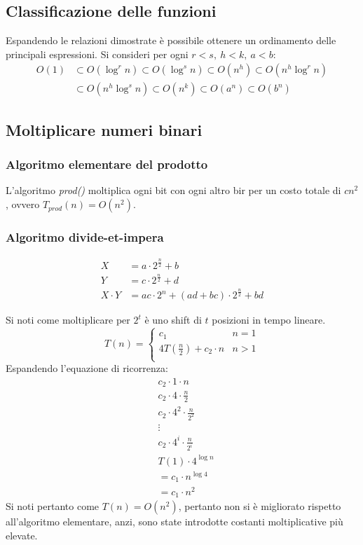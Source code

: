 \subsection{Classificazione delle funzioni}
Espandendo le relazioni dimostrate \`e possibile ottenere un ordinamento delle principali espressioni. Si consideri per ogni $r<s,\ h<k,\ a<b$:
\begin{align*}
O(1)&\subset O(\log^r n)\subset O(\log^s n)\subset O(n^h)\subset O(n^h\log^r n)\\
&\subset O(n^h\log^s n)\subset O(n^k)\subset O(a^n)\subset O(b^n)
\end{align*}
\subsection{Moltiplicare numeri binari}
\subsubsection{Algoritmo elementare del prodotto}
L'algoritmo \emph{prod()} moltiplica ogni bit con ogni altro bir per un costo totale di $cn^2$, ovvero $T_{prod}(n)=O(n^2)$.
\subsubsection{Algoritmo divide-et-impera}
\begin{align*}
	X &= a\cdot 2^{\frac{n}{2}}+ b\\
	Y &= c\cdot 2^{\frac{n}{2}}+ d\\
 X\cdot Y &= ac\cdot 2^n + (ad+bc)\cdot 2^{\frac{n}{2}} +bd
\end{align*}

Si noti come moltiplicare per $2^t$ \`e uno shift di $t$ posizioni in tempo lineare. 
$$T(n) = \begin{cases}
	c_1 & n = 1\\
	4T(\frac{n}{2}) + c_2\cdot n &n>1\\
\end{cases}$$
Espandendo l'equazione di ricorrenza: 
\begin{align*}
	&c_2\cdot1\cdot n\\
	&c_2\cdot 4\cdot \frac{n}{2}\\
	&c_2\cdot 4^2\cdot\frac{n}{2^2}\\
	&\vdots\\
	&c_2\cdot 4^i\cdot\frac{n}{2^i}\\
	&T(1)\cdot4^{\log n}\\
	&=c_1\cdot n^{\log 4}\\
	&=c_1\cdot n^2
\end{align*}
Si noti pertanto come $T(n) = O(n^2)$, pertanto non si \`e migliorato rispetto all'algoritmo elementare, anzi, sono state introdotte costanti moltiplicative pi\`u elevate. 
